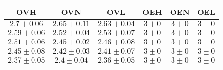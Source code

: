 \begin{tabular}{|c|c|c|c|c|c|}
\hline 
OVH & OVN & OVL & OEH & OEN & OEL\\ 
\hline 
\hline 
$2.7\pm0.06$ & $2.65\pm0.11$ & $2.63\pm0.04$ & $3\pm0$ & $3\pm0$ & $3\pm0$ \\ 
\hline 
$2.59\pm0.06$ & $2.52\pm0.04$ & $2.53\pm0.07$ & $3\pm0$ & $3\pm0$ & $3\pm0$ \\ 
\hline 
$2.51\pm0.06$ & $2.45\pm0.02$ & $2.46\pm0.08$ & $3\pm0$ & $3\pm0$ & $3\pm0$ \\ 
\hline 
$2.45\pm0.08$ & $2.42\pm0.03$ & $2.41\pm0.07$ & $3\pm0$ & $3\pm0$ & $3\pm0$ \\ 
\hline 
$2.37\pm0.05$ & $2.4\pm0.04$ & $2.36\pm0.05$ & $3\pm0$ & $3\pm0$ & $3\pm0$ \\ 
\hline 
\end{tabular}